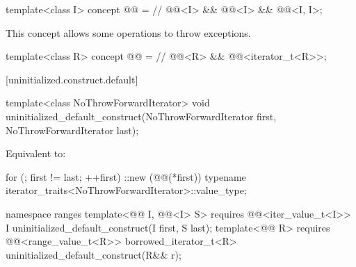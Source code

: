 \begin{itemdecl}
template<class I>
concept @@ = // \expos
  @@<I> &&
  @@<I> &&
  @@<I, I>;
\end{itemdecl}

\begin{itemdescr}
\pnum
\begin{note}
This concept allows some 
operations to throw exceptions.
\end{note}
\end{itemdescr}

\begin{itemdecl}
template<class R>
concept @@ = // \expos
  @@<R> &&
  @@<iterator_t<R>>;
\end{itemdecl}

[uninitialized.construct.default]{}

%
\begin{itemdecl}
template<class NoThrowForwardIterator>
  void uninitialized_default_construct(NoThrowForwardIterator first, NoThrowForwardIterator last);
\end{itemdecl}

\begin{itemdescr}
\pnum
\effects
Equivalent to:
\begin{codeblock}
for (; first != last; ++first)
  ::new (@@(*first))
    typename iterator_traits<NoThrowForwardIterator>::value_type;
\end{codeblock}
\end{itemdescr}

%
\begin{itemdecl}
namespace ranges {
  template<@@ I, @@<I> S>
    requires @@<iter_value_t<I>>
    I uninitialized_default_construct(I first, S last);
  template<@@ R>
    requires @@<range_value_t<R>>
    borrowed_iterator_t<R> uninitialized_default_construct(R&& r);
}
\end{itemdecl}

